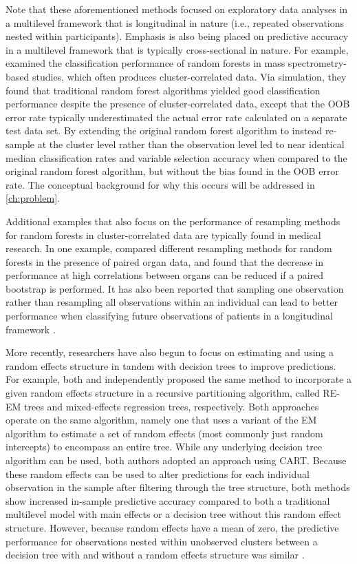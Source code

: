 	Note that these aforementioned methods focused on exploratory data analyses in a multilevel framework that is longitudinal in nature (i.e., repeated observations nested within participants). Emphasis is also being placed on predictive accuracy in a multilevel framework that is typically cross-sectional in nature. For example,  examined the classification performance of random forests in mass spectrometry-based studies, which often produces cluster-correlated data. Via simulation, they found that traditional random forest algorithms yielded good classification performance despite the presence of cluster-correlated data, except that the OOB error rate typically underestimated the actual error rate calculated on a separate test data set. By extending the original random forest algorithm to instead re-sample at the cluster level rather than the observation level led to near identical median classification rates and variable selection accuracy when compared to the original random forest algorithm, but without the bias found in the OOB error rate. The conceptual background for why this occurs will be addressed in \autoref{ch:problem}.  


	Additional examples that also focus on the performance of resampling methods for random forests in cluster-correlated data are typically found in medical research. In one example,  compared different resampling methods for random forests in the presence of paired organ data, and found that the decrease in performance at high correlations between organs can be reduced if a paired bootstrap is performed. It has also been reported that sampling one observation rather than resampling all observations within an individual can lead to better performance when classifying future observations of patients in a longitudinal framework \cite{adler2011classification}.


	More recently, researchers have also begun to focus on estimating and using a random effects structure in tandem with decision trees to improve predictions. For example, both  and  independently proposed the same method to incorporate a given random effects structure in a recursive partitioning algorithm, called RE-EM trees and mixed-effects regression trees, respectively. Both approaches operate on the same algorithm, namely one that uses a variant of the EM algorithm to estimate a set of random effects (most commonly just random intercepts) to encompass an entire tree. While any underlying decision tree algorithm can be used, both authors adopted an approach using CART. Because these random effects can be used to alter predictions for each individual observation in the sample after filtering through the tree structure, both methods show increased in-sample predictive accuracy compared to both a traditional multilevel model with main effects or a decision tree without this random effect structure. However, because random effects have a mean of zero, the predictive performance for observations nested within unobserved clusters between a decision tree with and without a random effects structure was similar \cite{hajjem2011mixed, sela2012re}.


